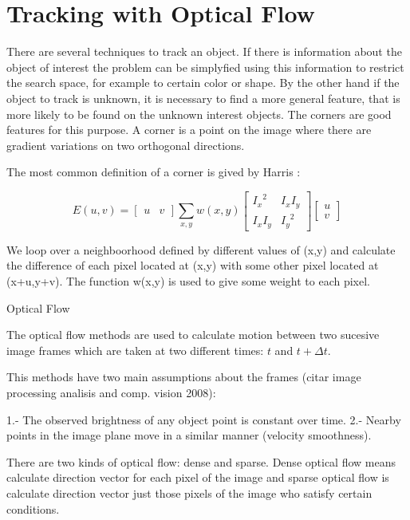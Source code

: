  

\section{Tracking with Optical Flow}

There are several techniques to track an object. If there is information about the object of interest the problem 
can be simplyfied using this information to restrict the search space, for example to certain color or shape.
 By the other hand if the object to track is unknown, it is necessary to find a more general feature, that is 
more likely to be found on the unknown interest objects. The corners are good features for this purpose. A corner 
is a point on the image where there are gradient variations on two orthogonal directions.

The most common definition of a corner is gived by Harris :

$$
E(u,v) = \begin{bmatrix} u & v \end{bmatrix} \sum\limits_{x,y} w(x,y) \begin{bmatrix} {I_x}^2 & I_x I_y \\ I_x I_y & {I_y}^2 \end{bmatrix} \begin{bmatrix} u \\ v \end{bmatrix}
$$

We loop over a neighboorhood defined by different values of (x,y) and calculate 
the difference of each pixel located at (x,y) with some other pixel located at (x+u,y+v). 
The function w(x,y) is used to give some weight to each pixel. 


Optical Flow

The optical flow methods are used to calculate motion between two sucesive image frames which are taken
 at two different times: $t$ and $t + \Delta t$.

This methods have two main assumptions about the frames (citar image processing analisis and comp. vision 2008):

1.- The observed brightness of any object point is constant over time.
2.- Nearby points in the image plane move in a similar manner (velocity smoothness).


There are two kinds of optical flow: dense and sparse. Dense optical flow means  calculate direction vector for each pixel of the image and sparse optical flow is calculate direction vector just those pixels of the image 
who satisfy certain conditions.

